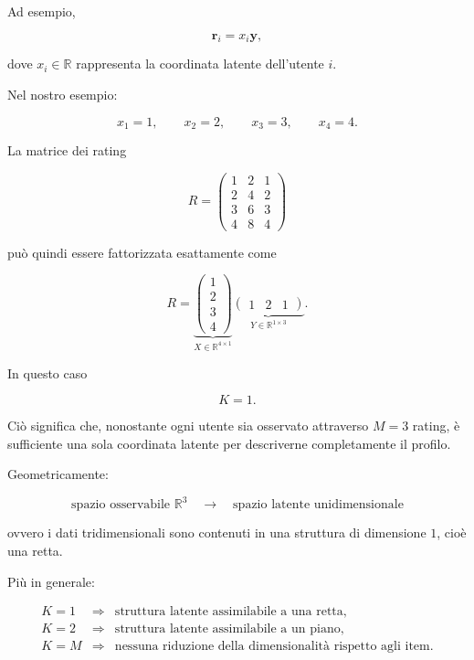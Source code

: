 Ad esempio,

\[
\mathbf{r}_i = x_i\mathbf{y},
\]

dove \(x_i\in\mathbb{R}\) rappresenta la coordinata latente dell'utente \(i\).

Nel nostro esempio:

\[
x_1=1,
\qquad
x_2=2,
\qquad
x_3=3,
\qquad
x_4=4.
\]

La matrice dei rating

\[
R=
\begin{pmatrix}
1 & 2 & 1\\
2 & 4 & 2\\
3 & 6 & 3\\
4 & 8 & 4
\end{pmatrix}
\]

può quindi essere fattorizzata esattamente come

\[
R=
\underbrace{
\begin{pmatrix}
1\\
2\\
3\\
4
\end{pmatrix}
}_{X\in\mathbb{R}^{4\times 1}}
\underbrace{
\begin{pmatrix}
1 & 2 & 1
\end{pmatrix}
}_{Y\in\mathbb{R}^{1\times 3}}.
\]

In questo caso

\[
K=1.
\]

Ciò significa che, nonostante ogni utente sia osservato attraverso \(M=3\) rating, è sufficiente una sola coordinata latente per descriverne completamente il profilo.

Geometricamente:

\[
\boxed{
\text{spazio osservabile } \mathbb{R}^{3}
\quad\longrightarrow\quad
\text{spazio latente unidimensionale}
}
\]

ovvero i dati tridimensionali sono contenuti in una struttura di dimensione \(1\), cioè una retta.

Più in generale:

\[
\begin{array}{ccl}
K=1 &\Longrightarrow& \text{struttura latente assimilabile a una retta},\\[2mm]
K=2 &\Longrightarrow& \text{struttura latente assimilabile a un piano},\\[2mm]
K=M &\Longrightarrow& \text{nessuna riduzione della dimensionalità rispetto agli item}.
\end{array}
\]

